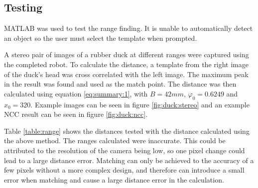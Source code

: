 \subsection{Testing}
MATLAB was used to test the range finding. It is unable to automatically detect an object so the user must select the template when prompted. 

A stereo pair of images of a rubber duck at different ranges were captured using the completed robot. To calculate the distance, a template from the right image of the duck's head was cross correlated with the left image. The maximum peak in the result was found and used as the match point. The distance was then calculated using equation \eqref{eq:summary:1}, with $B=42mm$, $\varphi_0=0.6249$ and $x_0=320$. Example images can be seen in figure \ref{fig:duck:stereo} and an example NCC result can be seen in figure \ref{fig:duck:ncc}. 

Table \ref{table:range} shows the distances tested with the distance calculated using the above method. The ranges calculated were inaccurate. This could be attributed to the resolution of the camera being low, so one pixel change could lead to a large distance error. Matching can only be achieved to the accuracy of a few pixels without a more complex design, and therefore can introduce a small error when matching and cause a large distance error in the calculation. 

